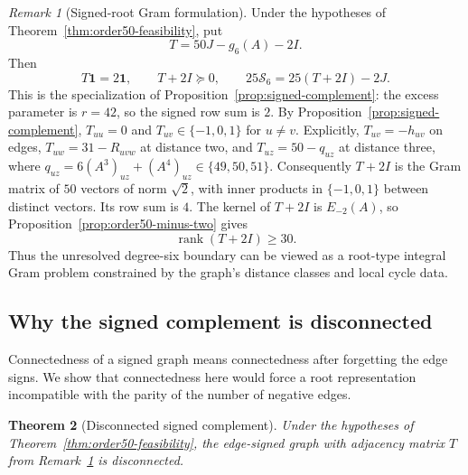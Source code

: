 \documentclass[a4paper,10pt,reqno]{amsart}
\theoremstyle{plain}
\newtheorem{theorem}{Theorem}[section]
\theoremstyle{definition}
\theoremstyle{remark}
\newtheorem{remark}[theorem]{Remark}
\newcommand{\one}{\mathbf 1}
\begin{document}
\begin{remark}[Signed-root Gram formulation]\label{rem:signed-root}
Under the hypotheses of Theorem~\ref{thm:order50-feasibility}, put
\[
 T=50J-g_6(A)-2I.
\]
Then
\[
 T\one=2\one,\qquad T+2I\succeq0,
 \qquad 25\mathcal S_6=25(T+2I)-2J.
\]
This is the specialization of Proposition~\ref{prop:signed-complement}:
the excess parameter is \(r=42\), so the signed row sum is \(2\).
By Proposition~\ref{prop:signed-complement}, \(T_{uu}=0\) and
\(T_{uv}\in\{-1,0,1\}\) for \(u\ne v\). Explicitly, \(T_{uv}=-h_{uv}\) on
edges, \(T_{uw}=31-R_{uvw}\) at distance two, and \(T_{uz}=50-q_{uz}\) at
distance three, where \(q_{uz}=6(A^3)_{uz}+(A^4)_{uz}\in\{49,50,51\}\).
 Consequently \(T+2I\) is the Gram matrix of \(50\) vectors of norm
 \(\sqrt2\), with inner products in \(\{-1,0,1\}\) between distinct vectors.
 Its row sum is \(4\).  The kernel of \(T+2I\) is \(E_{-2}(A)\), so
 Proposition~\ref{prop:order50-minus-two} gives
 \[
  \operatorname{rank}(T+2I)\ge30.
 \]
Thus the unresolved degree-six boundary can be viewed as a
 root-type integral Gram problem constrained by the graph's distance classes
 and local cycle data.
\end{remark}

\subsection{Why the signed complement is disconnected}

Connectedness of a signed graph means connectedness after forgetting the
edge signs. We show that connectedness here would force a root
representation incompatible with the parity of the number of negative
edges.

\begin{theorem}[Disconnected signed complement]\label{thm:order50-disconnected}
Under the hypotheses of Theorem~\ref{thm:order50-feasibility}, the edge-signed
graph with adjacency matrix \(T\) from Remark~\ref{rem:signed-root} is
disconnected.
\end{theorem}
\end{document}
